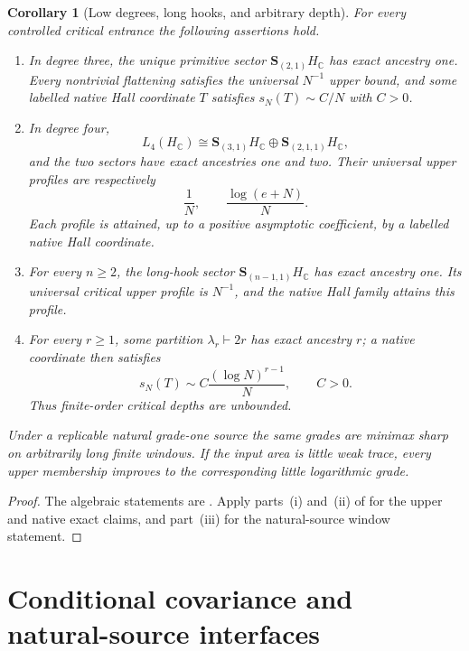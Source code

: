 \documentclass[10pt,reqno]{amsart}
\theoremstyle{plain}
\newtheorem{corollary}[theorem]{Corollary}
\theoremstyle{definition}
\theoremstyle{remark}
\begin{document}
\begin{corollary}[Low degrees, long hooks, and arbitrary depth]
\label{cc:gen-corollary-sharp-sectors}
For every controlled critical entrance the following assertions hold.
\begin{enumerate}[label=\textup{(\roman*)},leftmargin=2.8em]
\item In degree three, the unique primitive sector
$\mathbf S_{(2,1)}H_{\mathbb C}$ has exact ancestry one.  Every nontrivial
flattening satisfies the universal $N^{-1}$ upper bound, and some labelled
native Hall coordinate $T$ satisfies $s_N(T)\sim C/N$ with $C>0$.
\item In degree four,
\[
 L_4(H_{\mathbb C})
 \cong\mathbf S_{(3,1)}H_{\mathbb C}
 \oplus\mathbf S_{(2,1,1)}H_{\mathbb C},
\]
and the two sectors have exact ancestries one and two.  Their universal upper
profiles are respectively
\[
 \frac1N,
 \qquad
 \frac{\log(e+N)}N.
\]
Each profile is attained, up to a positive asymptotic coefficient, by a
labelled native Hall coordinate.
\item For every $n\ge2$, the long-hook sector
$\mathbf S_{(n-1,1)}H_{\mathbb C}$ has exact ancestry one.  Its universal
critical upper profile is $N^{-1}$, and the native Hall family attains this
profile.
\item For every $r\ge1$, some partition $\lambda_r\vdash2r$ has exact
ancestry $r$; a native coordinate then satisfies
\[
 s_N(T)\sim C\frac{(\log N)^{r-1}}N,
 \qquad C>0.
\]
Thus finite-order critical depths are unbounded.
\end{enumerate}
Under a replicable natural grade-one source the same grades are minimax sharp
on arbitrarily long finite windows.  If the input area is little weak trace,
every upper membership improves to the corresponding little logarithmic
grade.
\end{corollary}

\begin{proof}
The algebraic statements are .  Apply
parts~\textup{(i)} and~\textup{(ii)} of
 for the upper and native exact
claims, and part~\textup{(iii)} for the natural-source window statement.
\end{proof}

\section{Conditional covariance and natural-source interfaces}
\label{sec:conditional-interface}
\end{document}
